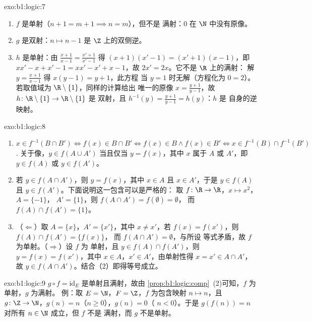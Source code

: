 \begin{solution}{exo:b1:logic:7}
\begin{enumerate}
  \item $f$ 是单射（$n + 1 = m + 1 \implies n = m$），但不是
        满射：$0$ 在 $\N$ 中没有原像。
  \item $g$ 是双射：$n \mapsto n - 1$ 是
        $\Z$ 上的双侧逆。
  \item $h$ 是单射：由 $\frac{x+1}{x-1} = \frac{x'+1}{x'-1}$ 得
        $(x+1)(x'-1) = (x'+1)(x-1)$，即 $xx' - x + x' - 1 = xx' -
        x' + x - 1$，故 $2x' = 2x$。它不是 $\R$ 上的满射：
        解 $y = \frac{x+1}{x-1}$ 得 $x(y - 1) = y + 1$，此方程
        当 $y = 1$ 时无解（方程化为 $0 = 2$）。
        若取值域为 $\R \setminus \{1\}$，同样的计算给出
        唯一的原像 $x = \frac{y+1}{y-1}$，故
        $h \colon \R \setminus \{1\} \to \R \setminus \{1\}$ 是
        双射，且 $h^{-1}(y) = \frac{y+1}{y-1} = h(y)$：$h$ 是
        自身的逆映射。
\end{enumerate}
\end{solution}

\begin{solution}{exo:b1:logic:8}
\begin{enumerate}
  \item $x \in f^{-1}(B \cap B') \iff f(x) \in B \cap B' \iff f(x) \in
        B \land f(x) \in B' \iff x \in f^{-1}(B) \cap f^{-1}(B')$.
        关于像，$y \in f(A \cup A')$ 当且仅当 $y = f(x)$，其中 $x$
        属于 $A$ 或 $A'$，即 $y \in f(A)$ 或 $y \in f(A')$。
  \item 若 $y \in f(A \cap A')$，则 $y = f(x)$，其中 $x \in A$ 且
        $x \in A'$，于是 $y \in f(A)$ 且 $y \in f(A')$。下面说明这一包含可以是严格的：
        取 $f \colon \R \to \R$，$x \mapsto x^2$，$A = \{-1\}$，
        $A' = \{1\}$，则 $f(A \cap A') = f(\emptyset) = \emptyset$，
        而 $f(A) \cap f(A') = \{1\}$。
  \item （$\Leftarrow$）取 $A = \{x\}$，$A' = \{x'\}$，其中 $x \neq
        x'$，若 $f(x) = f(x')$，则 $f(A) \cap f(A') = \{f(x)\}$，
        而 $f(A \cap A') = \emptyset$，与所设
        等式矛盾，故 $f$ 为单射。（$\Rightarrow$）设 $f$ 为
        单射，且 $y \in f(A) \cap f(A')$，则 $y = f(x) = f(x')$，其中
        $x \in A$，$x' \in A'$，由单射性得 $x = x' \in A \cap
        A'$，故 $y \in f(A \cap A')$。结合（2）即得等号成立。
\end{enumerate}
\end{solution}

\begin{solution}{exo:b1:logic:9}
$g \circ f = \mathrm{id}_E$ 是单射且满射，故由
\cref{prop:b1:logic:comp}~(2)可知，$f$ 为单射，$g$ 为满射。
例：取 $E = \N$，$F = \Z$，$f$ 为包含映射 $n \mapsto n$，且
$g \colon \Z \to \N$，$g(n) = n$（$n \geq 0$），$g(n) = 0$（
$n < 0$）。于是 $g(f(n)) = n$ 对所有 $n \in \N$ 成立，但 $f$ 不是
满射，而 $g$ 不是单射。
\end{solution}

